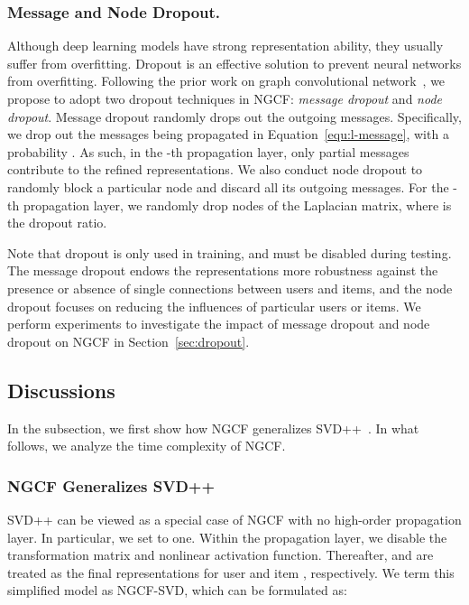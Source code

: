 \documentclass[sigconf]{acmart}
\theoremstyle{definition}
\begin{document}
\subsubsection{\textbf{Message and Node Dropout.}}
Although deep learning models have strong representation ability, they usually suffer from overfitting.
Dropout is an effective solution to prevent neural networks from overfitting.
Following the prior work on graph convolutional network~\cite{GC-MC}, we propose to adopt two dropout techniques in NGCF: \emph{message dropout} and \emph{node dropout}.
Message dropout randomly drops out the outgoing messages.
Specifically, we drop out the messages being propagated in Equation~\eqref{equ:l-message}, with a probability .
As such, in the -th propagation layer, only partial messages contribute to the refined representations.
We also conduct node dropout to randomly block a particular node and discard all its outgoing messages.
For the -th propagation layer, we randomly drop  nodes of the Laplacian matrix, where  is the dropout ratio.

Note that dropout is only used in training, and must be disabled during testing. 
The message dropout endows the representations more robustness against the presence or absence of single connections between users and items, and the node dropout focuses on reducing the influences of particular users or items. 
We perform experiments to investigate the impact of message dropout and node dropout on NGCF in Section~\ref{sec:dropout}.

\subsection{Discussions}\label{ss:discussions}
In the subsection, we first show how NGCF generalizes SVD++~\cite{SVDFeatures}.
In what follows, we analyze the time complexity of NGCF.

\subsubsection{\textbf{NGCF Generalizes SVD++}}\label{sec:generalize-mf-svd}
SVD++ can be viewed as a special case of NGCF with no high-order propagation layer.
In particular, we set  to one.
Within the propagation layer, we disable the transformation matrix and nonlinear activation function.
Thereafter,  and  are treated as the final representations for user  and item , respectively.
We term this simplified model as NGCF-SVD, which can be formulated as:
\end{document}
